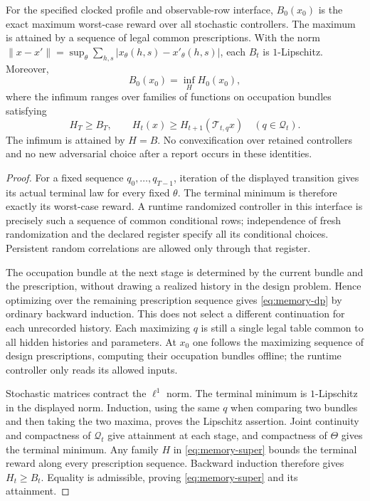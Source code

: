 \begin{theorem}
\label{thm:memory-dp}
For the specified clocked profile and observable-row interface,
$B_0(x_0)$ is the exact maximum worst-case reward over all stochastic
controllers. The maximum is attained by a sequence of legal common
prescriptions. With the norm
$\|x-x'\|=\sup_\theta\sum_{h,s}|x_\theta(h,s)-x'_\theta(h,s)|$,
each $B_t$ is $1$-Lipschitz. Moreover,
\begin{equation}\label{eq:memory-super}
 B_0(x_0)=\inf_H H_0(x_0),
\end{equation}
where the infimum ranges over families of functions on occupation
bundles satisfying
\[
 H_T\ge B_T,\qquad
 H_t(x)\ge H_{t+1}(\mathcal T_{t,q}x)
                       \quad(q\in\mathcal Q_t).
\]
The infimum is attained by $H=B$. No convexification over retained
controllers and no new adversarial choice after a report occurs in
these identities.
\end{theorem}
\begin{proof}
For a fixed sequence $q_0,\ldots,q_{T-1}$, iteration of the displayed
transition gives its actual terminal law for every fixed $\theta$.
The terminal minimum is therefore exactly its worst-case reward.
A runtime randomized controller in this interface is precisely such a
sequence of common conditional rows; independence of fresh randomization
and the declared register specify all its conditional choices.
Persistent random correlations are allowed only through that register.

The occupation bundle at the next stage is determined by the current
bundle and the prescription, without drawing a realized history in the
design problem. Hence optimizing over the remaining prescription
sequence gives \eqref{eq:memory-dp} by ordinary backward induction.
This does not select a different continuation for each unrecorded
history. Each maximizing $q$ is still a single legal table common to
all hidden histories and parameters. At $x_0$ one follows the maximizing
sequence of design prescriptions, computing their occupation bundles
offline; the runtime controller only reads its allowed inputs.

Stochastic matrices contract the $\ell^1$ norm. The terminal minimum is
$1$-Lipschitz in the displayed norm. Induction, using the same $q$ when
comparing two bundles and then taking the two maxima, proves the
Lipschitz assertion. Joint continuity and compactness of $\mathcal Q_t$
give attainment at each stage, and compactness of $\Theta$ gives the
terminal minimum. Any family $H$ in \eqref{eq:memory-super} bounds the
terminal reward along every prescription sequence. Backward induction
therefore gives $H_t\ge B_t$. Equality is admissible, proving
\eqref{eq:memory-super} and its attainment.
\end{proof}

